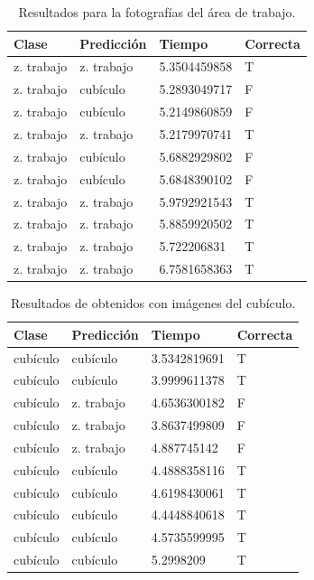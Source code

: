 \begin{table}[!h]
\centering
\begin{tabular}{|l|l|l|l|}
\hline
Clase      & Predicción & Tiempo        & Correcta \\ \hline
z. trabajo & z. trabajo & 5.3504459858 & T        \\ \hline
z. trabajo & cubículo    & 5.2893049717 & F        \\ \hline
z. trabajo & cubículo    & 5.2149860859 & F        \\ \hline
z. trabajo & z. trabajo & 5.2179970741 & T        \\ \hline
z. trabajo & cubículo    & 5.6882929802 & F        \\ \hline
z. trabajo & cubículo    & 5.6848390102 & F        \\ \hline
z. trabajo & z. trabajo & 5.9792921543 & T        \\ \hline
z. trabajo & z. trabajo & 5.8859920502 & T        \\ \hline
z. trabajo & z. trabajo & 5.722206831  & T        \\ \hline
z. trabajo & z. trabajo & 6.7581658363 & T        \\ \hline
\end{tabular}
\caption{Resultados para la fotografías del área
de trabajo.}
\label{table:desks}
\end{table}

\begin{table}[!h]
\centering
\begin{tabular}{|l|l|l|l|}
\hline
Clase   & Predicción & Tiempo        & Correcta \\ \hline
cubículo & cubículo    & 3.5342819691 & T        \\ \hline
cubículo & cubículo    & 3.9999611378 & T        \\ \hline
cubículo & z. trabajo & 4.6536300182 & F        \\ \hline
cubículo & z. trabajo & 3.8637499809 & F        \\ \hline
cubículo & z. trabajo & 4.887745142  & F        \\ \hline
cubículo & cubículo    & 4.4888358116 & T        \\ \hline
cubículo & cubículo    & 4.6198430061 & T        \\ \hline
cubículo & cubículo    & 4.4448840618 & T        \\ \hline
cubículo & cubículo    & 4.5735599995 & T        \\ \hline
cubículo & cubículo    & 5.2998209    & T        \\ \hline
\end{tabular}
\caption{Resultados de obtenidos con imágenes del cubículo.}
\label{table:office}
\end{table}

